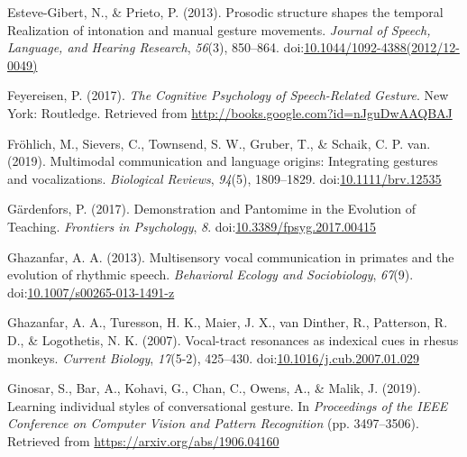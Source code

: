 \documentclass[
  man, noextraspace,floatsintext]{apa6}
\newlength{\cslhangindent}
\newenvironment{cslreferences}%
  {\setlength{\parindent}{0pt}%
  \everypar{\setlength{\hangindent}{\cslhangindent}}\ignorespaces}%
  {\par}
\begin{document}
\begin{cslreferences}
\leavevmode\hypertarget{ref-esteve-gibertProsodicStructureShapes2013}{}%
Esteve-Gibert, N., \& Prieto, P. (2013). Prosodic structure shapes the temporal Realization of intonation and manual gesture movements. \emph{Journal of Speech, Language, and Hearing Research}, \emph{56}(3), 850--864. doi:\href{https://doi.org/10.1044/1092-4388(2012/12-0049)}{10.1044/1092-4388(2012/12-0049)}

\leavevmode\hypertarget{ref-feyereisenCognitivePsychologySpeechRelated2017}{}%
Feyereisen, P. (2017). \emph{The Cognitive Psychology of Speech-Related Gesture}. New York: Routledge. Retrieved from \url{http://books.google.com?id=nJguDwAAQBAJ}

\leavevmode\hypertarget{ref-frohlichMultimodalCommunicationLanguage2019}{}%
Fröhlich, M., Sievers, C., Townsend, S. W., Gruber, T., \& Schaik, C. P. van. (2019). Multimodal communication and language origins: Integrating gestures and vocalizations. \emph{Biological Reviews}, \emph{94}(5), 1809--1829. doi:\href{https://doi.org/10.1111/brv.12535}{10.1111/brv.12535}

\leavevmode\hypertarget{ref-gardenforsDemonstrationPantomimeEvolution2017}{}%
Gärdenfors, P. (2017). Demonstration and Pantomime in the Evolution of Teaching. \emph{Frontiers in Psychology}, \emph{8}. doi:\href{https://doi.org/10.3389/fpsyg.2017.00415}{10.3389/fpsyg.2017.00415}

\leavevmode\hypertarget{ref-ghazanfarMultisensoryVocalCommunication2013}{}%
Ghazanfar, A. A. (2013). Multisensory vocal communication in primates and the evolution of rhythmic speech. \emph{Behavioral Ecology and Sociobiology}, \emph{67}(9). doi:\href{https://doi.org/10.1007/s00265-013-1491-z}{10.1007/s00265-013-1491-z}

\leavevmode\hypertarget{ref-ghazanfarVocaltractResonancesIndexical2007}{}%
Ghazanfar, A. A., Turesson, H. K., Maier, J. X., van Dinther, R., Patterson, R. D., \& Logothetis, N. K. (2007). Vocal-tract resonances as indexical cues in rhesus monkeys. \emph{Current Biology}, \emph{17}(5-2), 425--430. doi:\href{https://doi.org/10.1016/j.cub.2007.01.029}{10.1016/j.cub.2007.01.029}

\leavevmode\hypertarget{ref-ginosarLearningIndividualStyles2019}{}%
Ginosar, S., Bar, A., Kohavi, G., Chan, C., Owens, A., \& Malik, J. (2019). Learning individual styles of conversational gesture. In \emph{Proceedings of the IEEE Conference on Computer Vision and Pattern Recognition} (pp. 3497--3506). Retrieved from \url{https://arxiv.org/abs/1906.04160}


\end{cslreferences}
\end{document}
